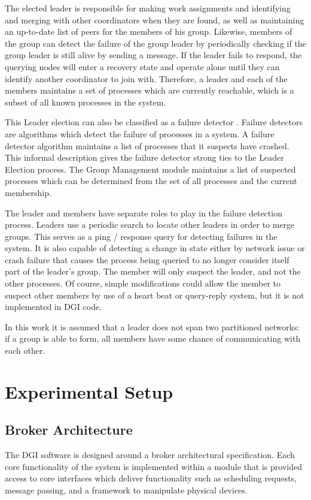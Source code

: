 The elected leader is responsible for making work assignments and identifying
and merging with other coordinators when they are found, as well as maintaining
an up-to-date list of peers for the members of his group.  Likewise, members of
the group can detect the failure of the group leader by periodically checking
if the group leader is still alive by sending a message. If the leader fails to
respond, the querying nodes will enter a recovery state and operate alone until
they can identify another coordinator to join with. Therefore, a leader and each
of the members maintains a set of processes which are currently reachable, which
is a subset of all known processes in the system.

This Leader election can also be classified as a failure detector
\cite{LEADERELECTIONEVAL}. Failure detectors are algorithms which detect the failure of processes in a
system. A failure detector algorithm maintains a list of processes that it suspects have
crashed. This informal description gives the failure detector strong ties to the
Leader Election process. The Group Management module maintains a list of
suspected processes which can be determined from the set of all processes and the current
membership.

The leader and members have separate roles to play in the failure detection
process. Leaders use a periodic search to locate other leaders in order to merge groups.
 This serves as a ping / response query for
detecting failures in the system. It is also capable of detecting a change in state either
by network issue or crash failure that causes the process being queried to no
longer consider itself part of the leader's group. The member will only suspect the leader, and not the other processes.
Of course, simple modifications could allow the member to suspect other members
by use of a heart beat or query-reply system, but it is not implemented in DGI code.

In this work it is assumed that a leader does not span two partitioned networks:
if a group is able to form, all members have some chance of communicating with
each other.

\section {Experimental Setup}

\subsection{Broker Architecture}
The DGI software is designed around a broker architectural specification.
Each core functionality of the system is implemented within a module that is
provided access to core interfaces which deliver functionality such as
scheduling requests, message passing, and a framework to manipulate physical
devices.

